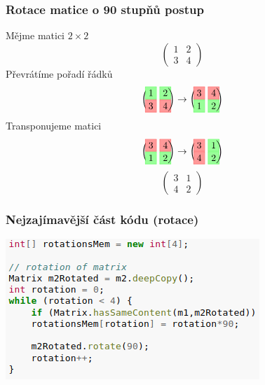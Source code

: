 \documentclass{beamer}
\newcommand{\rlight}[1]{%
    \ooalign{\hss\makebox[0pt]{\fcolorbox{red!80}{red!40}{$#1$}}\hss\cr\phantom{$#1$}}%
}
\newcommand{\glight}[1]{%
    \ooalign{\hss\makebox[0pt]{\fcolorbox{green!80}{green!40}{$#1$}}\hss\cr\phantom{$#1$}}%
}
\begin{document}
\begin{frame}
    \frametitle{Rotace matice o 90 stupňů \small{postup}}
    Mějme matici $2\times2$
    \[
    \begin{pmatrix}
        1 & 2\\
        3 & 4
    \end{pmatrix}
    \]
    Převrátíme pořadí řádků
    \[
    \begin{pmatrix}
        \glight{1} & \glight{2}\\
        \rlight{3} & \rlight{4}
    \end{pmatrix}
    \rightarrow
    \begin{pmatrix}
        \rlight{3} & \rlight{4}\\
        \glight{1} & \glight{2}
    \end{pmatrix}
    \]
    Transponujeme matici
    \[
    \begin{pmatrix}
        \rlight{3} & \rlight{4}\\
        \glight{1} & \glight{2}
    \end{pmatrix}
    \rightarrow
    \begin{pmatrix}
        \rlight{3} & \glight{1}\\
        \rlight{4} & \glight{2}
    \end{pmatrix}
    \]
    \[
    \begin{pmatrix}
        3 & 1\\
        4 & 2
    \end{pmatrix}
    \]
\end{frame}
\begin{frame}
\frametitle{Nejzajímavější část kódu (rotace)}
\includegraphics[scale=0.6]{java-code}

\end{frame}
\end{document}
